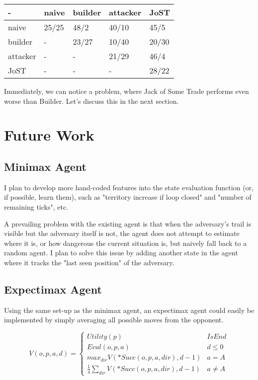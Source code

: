 \documentclass[10pt]{article}
\begin{document}
\begin{table}[h]
\centering
\begin{tabular}{|l||l|l|l|l|}
\hline
-        & naive & builder & attacker & JoST  \\ \hline \hline
naive    & 25/25 & 48/2    & 40/10    & 45/5  \\ \hline
builder  & -     & 23/27   & 10/40    & 20/30 \\ \hline
attacker & -     & -       & 21/29    & 46/4  \\ \hline
JoST     & -     & -       & -        & 28/22 \\ \hline
\end{tabular}
\end{table}

Immediately, we can notice a problem, where Jack of Some Trade performs even worse than Builder. Let's discuss this in the next section.

\section{Future Work}

\subsection{Minimax Agent}

I plan to develop more hand-coded features into the state evaluation function (or, if possible, learn them), such as "territory increase if loop closed" and "number of remaining ticks", etc.

A prevailing problem with the existing agent is that when the adversary's trail is visible but the adversary itself is not, the agent does not attempt to estimate where it is, or how dangerous the current situation is, but naively fall back to a random agent. I plan to solve this issue by adding another state in the agent where it tracks the "last seen position" of the adversary.

\subsection{Expectimax Agent}

Using the same set-up as the minimax agent, an expectimax agent could easily be implemented by simply averaging all possible moves from the opponent.

\[
    V(o, p, a, d) = 
    \begin{cases}
        Utility(p) & IsEnd \\
        Eval(o,p,a) & d \leq 0 \\
        max_{dir} V(*Succ(o,p,a,dir), d-1) & a = A\\
        \frac{1}{4}\sum_{dir} V(*Succ(o,p,a,dir), d-1) & a \neq A\
    \end{cases} 
\]
\end{document}
